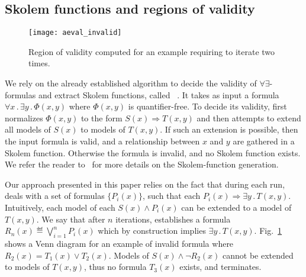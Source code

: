\subsection{Skolem functions and regions of validity}
\label{sec:aeval}

\begin{figure}[!t]
\centering
\texttt{[image: aeval\_invalid]}
\caption{Region of validity computed for an example requiring \aeval to iterate two times.}
\label{fg:aeval}
\end{figure}


We rely on the already established algorithm to decide the validity of $\forall\exists$-formulas and extract Skolem functions, called \aeval~\cite{fedyukovich2015automated}.
It takes as input a formula $\forall x \,.\, \exists y  \,.\, \Phi (x, y)$ where $\Phi (x, y)$ is quantifier-free.
To decide its validity, \aeval first normalizes $\Phi (x, y)$ to the form $S(x) \Rightarrow T(x, y)$ and then attempts to extend all models of $S(x)$ to models of $T(x,y)$.
If such an extension is possible, then the input formula is valid, and a relationship between $x$ and $y$ are gathered in a Skolem function.
Otherwise the formula is invalid, and no Skolem function exists.
We refer the reader to~\cite{KatisFGBGW16} for more details on the Skolem-function generation.

Our approach presented in this paper relies on the fact that during each run, \aeval deals with a set of formulas $\{P_i(x)\}$, such that each $P_i(x) \Rightarrow \exists y \,.\,T (x,y)$.
Intuitively, each model of each $S(x) \land P_i(x)$ can be extended to a model of $T(x, y)$.
We say that after $n$ iterations, \aeval establishes a formula $R_n(x) \eqdef \bigvee_{i=1}^n P_i(x)$ which by construction implies $\exists y\,.\,T(x,y)$.
Fig.~\ref{fg:aeval} shows a Venn diagram for an example of invalid formula where $R_2(x) = T_1(x) \lor T_2(x)$.
Models of $S(x) \land \neg{R_2(x)}$ cannot be extended to models of $T(x,y)$, thus no formula $T_3(x)$ exists, and \aeval terminates.

